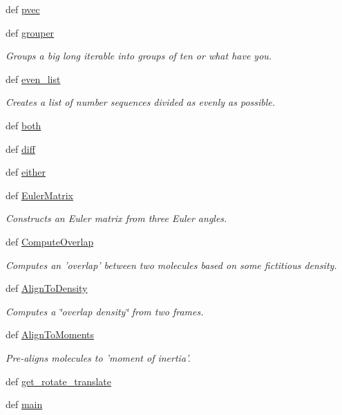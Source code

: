 \begin{DoxyCompactItemize}
\item 
def \hyperlink{namespaceforcebalance_1_1molecule_a58c3f09152db4d1c6e1db9df29c60c43}{pvec}
\item 
def \hyperlink{namespaceforcebalance_1_1molecule_a7fe52c2928c7b0329882541bef2e34cd}{grouper}
\begin{DoxyCompactList}\small\item\em \-Groups a big long iterable into groups of ten or what have you. \end{DoxyCompactList}\item 
def \hyperlink{namespaceforcebalance_1_1molecule_a5f529179461765fadbd0a742cdc2c677}{even\-\_\-list}
\begin{DoxyCompactList}\small\item\em \-Creates a list of number sequences divided as evenly as possible. \end{DoxyCompactList}\item 
def \hyperlink{namespaceforcebalance_1_1molecule_a5b50df23cc4d0e617fdc56538f0bea63}{both}
\item 
def \hyperlink{namespaceforcebalance_1_1molecule_a6f7c6217b1c64da309a8abd21dfdcf08}{diff}
\item 
def \hyperlink{namespaceforcebalance_1_1molecule_a75775be6563ad7f10695a9a45ff49ba9}{either}
\item 
def \hyperlink{namespaceforcebalance_1_1molecule_af02bf73765f34bbef81c4a5b000b86ce}{\-Euler\-Matrix}
\begin{DoxyCompactList}\small\item\em \-Constructs an \-Euler matrix from three \-Euler angles. \end{DoxyCompactList}\item 
def \hyperlink{namespaceforcebalance_1_1molecule_a8fcbb4a2b3470a85d25699b6f28a54fc}{\-Compute\-Overlap}
\begin{DoxyCompactList}\small\item\em \-Computes an 'overlap' between two molecules based on some fictitious density. \end{DoxyCompactList}\item 
def \hyperlink{namespaceforcebalance_1_1molecule_a9a58eb1746e51420f50da3f3a6d51485}{\-Align\-To\-Density}
\begin{DoxyCompactList}\small\item\em \-Computes a \char`\"{}overlap density\char`\"{} from two frames. \end{DoxyCompactList}\item 
def \hyperlink{namespaceforcebalance_1_1molecule_aa9ad9b92efa7bd3c1d589d62bbb8108e}{\-Align\-To\-Moments}
\begin{DoxyCompactList}\small\item\em \-Pre-\/aligns molecules to 'moment of inertia'. \end{DoxyCompactList}\item 
def \hyperlink{namespaceforcebalance_1_1molecule_a08840b73e95bf34bf9ca7ea36ad0492d}{get\-\_\-rotate\-\_\-translate}
\item 
def \hyperlink{namespaceforcebalance_1_1molecule_ab9cb167fbbd809aedcf8c7434d405547}{main}
\end{DoxyCompactItemize}
